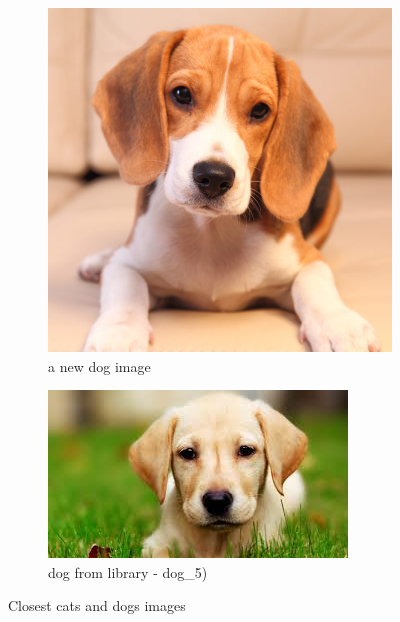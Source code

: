 \documentclass[a4paper]{iacas}
\begin{document}
\begin{figure}[!htbp]
	\begin{subfigure}{0.4\linewidth}
		\centering
		\includegraphics[width=\linewidth,scale=0.8]{imgs/dog.jpg}
		\caption{a new dog image}
	\end{subfigure}
	\begin{subfigure}{0.4\linewidth}
		\centering
		\includegraphics[width=\linewidth,scale=0.8]{imgs/dog_5.jpg}
		\caption{dog from library - dog\_5)}
	\end{subfigure}


	\caption{Closest cats and dogs images}
	\label{closest_cat_dog_images}
\end{figure}
\vskip 0.1in
\end{document}
